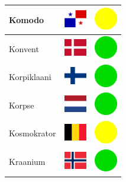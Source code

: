 \documentclass[12pt, a4paper, twoside]{report}
\begin{document}
\begin{center}
\begin{longtable}{|p{5cm}|p{2cm}|p{2cm}|}
 Komodo                                                     & \includegraphics[width=1cm]{../img/flags/pa} &   \includegraphics[width=1cm]{../likes/m} \\ \hline
 Konvent                                                    & \includegraphics[width=1cm]{../img/flags/dk} &   \includegraphics[width=1cm]{../likes/y} \\ \hline
 Korpiklaani                                                & \includegraphics[width=1cm]{../img/flags/fi} &   \includegraphics[width=1cm]{../likes/y} \\ \hline
 Korpse                                                     & \includegraphics[width=1cm]{../img/flags/nl} &   \includegraphics[width=1cm]{../likes/y} \\ \hline
 Kosmokrator                                                & \includegraphics[width=1cm]{../img/flags/be} &   \includegraphics[width=1cm]{../likes/m} \\ \hline
 Kraanium                                                   & \includegraphics[width=1cm]{../img/flags/no} &   \includegraphics[width=1cm]{../likes/y} \\ \hline

\end{longtable}
\end{center}
\end{document}
